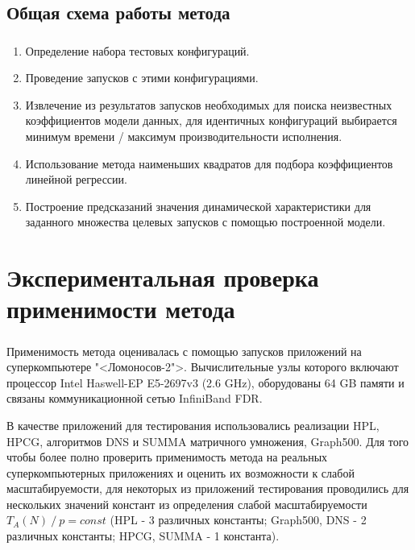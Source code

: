 \documentclass[unicode, t, 11pt]{beamer}%
\begin{document}
		\subsection{Общая схема работы метода}
		\begin{frame}
			\frametitle{\insertsection}
	 		\framesubtitle{\insertsubsection}
	 		\begin{enumerate}[label=\(\Roman{enumi}\)]
				\item Определение набора тестовых конфигураций.
				\item Проведение запусков с этими конфигурациями.
				\item Извлечение из результатов запусков необходимых для поиска неизвестных коэффициентов модели данных, для идентичных конфигураций выбирается минимум времени / максимум производительности исполнения.
				\item Использование метода наименьших квадратов для подбора коэффициентов линейной регрессии.
				\item Построение предсказаний значения динамической характеристики для заданного множества целевых запусков с помощью построенной модели.
			\end{enumerate}
		\end{frame}

	\section{Экспериментальная проверка применимости метода}
		\begin{frame}
			\frametitle{\insertsection}
			Применимость метода оценивалась с помощью запусков приложений на суперкомпьютере "<Ломоносов-2">. Вычислительные узлы которого включают процессор Intel Haswell-EP E5-2697v3 (2.6 GHz), оборудованы 64 GB памяти и связаны коммуникационной сетью InfiniBand FDR.

			В качестве приложений для тестирования использовались реализации HPL, HPCG, алгоритмов DNS и SUMMA матричного умножения, Graph500.
			Для того чтобы более полно проверить применимость метода на реальных суперкомпьютерных приложениях и оценить их возможности к слабой масштабируемости, для некоторых из приложений тестирования проводились для нескольких значений констант из определения слабой масштабируемости \(T_A(N)\:/\:p = const\) (HPL - 3 различных константы; Graph500, DNS - 2 различных константы; HPCG, SUMMA - 1 константа).


		\end{frame}
\end{document}
